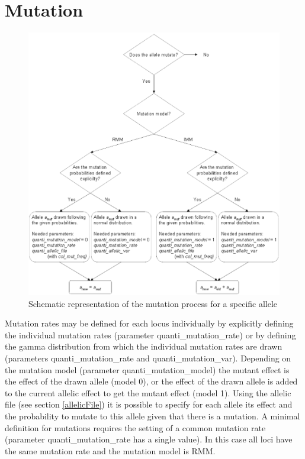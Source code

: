 \documentclass[letterpaper,12pt,oneside]{book}
\begin{document}
\section{Mutation}

\begin{figure}[htbp]
	\centering
		\includegraphics[width=1\textwidth]{mutation-quanti.pdf}
	\caption{Schematic representation of the mutation process for a specific allele}
	\label{fig:mutation-quanti}
\end{figure}

Mutation rates may be defined for each locus individually by explicitly defining the individual mutation rates (parameter \textsf{quanti\_mutation\_rate}) or by defining the gamma distribution from which the individual mutation rates are drawn (parameters \textsf{quanti\_mutation\_rate} and \textsf{quanti\_mutation\_var}). Depending on the mutation model (parameter \textsf{quanti\_mutation\_model}) the mutant effect is the effect of the drawn allele (model 0), or the effect of the drawn allele is added to the current allelic effect to get the mutant effect (model 1). Using the allelic file (see section \ref{allelicFile}) it is possible to specify for each allele its effect and the probability to mutate to this allele given that there is a mutation. A minimal definition for mutations requires the setting of a common mutation rate (parameter \textsf{quanti\_mutation\_rate} has a single value). In this case all loci have the same mutation rate and the mutation model is RMM.
\end{document}
